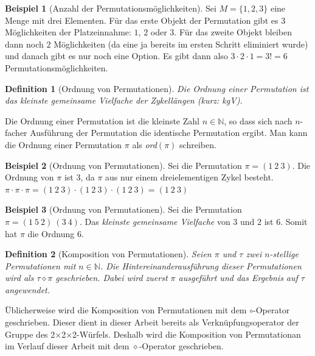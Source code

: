 \documentclass[12pt,a4paper, usenames, dvipsnames]{article}
\theoremstyle{mystyle}
\newtheorem{definition}{Definition}
\theoremstyle{definition}
\newtheorem{bsp}{Beispiel}[definition]
\newcommand{\Ttwo}{2$\times$2$\times$2-}
\begin{document}
\begin{bsp}[Anzahl der Permutationsmöglichkeiten]
Sei $M = \{ 1, 2,3  \}$ eine Menge mit drei Elementen. Für das erste Objekt der Permutation gibt es $3$ Möglichkeiten der Platzeinnahme: $1$, $2$ oder $3$. Für das zweite Objekt bleiben dann noch $2$ Möglichkeiten (da eine ja bereits im ersten Schritt eliminiert wurde) und danach gibt es nur noch eine Option. Es gibt dann also $3 \cdot 2 \cdot 1 = 3! = 6$ Permutationsmöglichkeiten.

\end{bsp}

\begin{definition}[Ordnung von Permutationen]

Die Ordnung einer Permutation ist das kleinste gemeinsame Vielfache der Zykellängen (kurz: kgV).

\end{definition}

Die Ordnung einer Permutation ist die kleinste Zahl $n \in \mathbb{N}$, so dass sich nach $n$-facher Ausführung der Permutation die identische Permutation ergibt. Man kann die Ordnung einer Permutation $\pi$ als \textit{ord}$(\pi)$ schreiben.

\begin{bsp}[Ordnung von Permutationen]

Sei die Permutation $\pi = (1 \ 2 \ 3)$. Die Ordnung von $\pi$ ist 3, da $\pi$ aus nur einem dreielementigen Zykel besteht. $\pi \cdot \pi \cdot \pi = (1 \ 2 \ 3) \cdot (1 \ 2 \ 3) \cdot (1 \ 2 \ 3) =  (1 \ 2 \ 3) $

\end{bsp}

\begin{bsp}[Ordnung von Permutationen]

Sei die Permutation $\pi = (1 \ 5 \ 2)\ (3 \ 4)$. Das \textit{kleinste gemeinsame Vielfache} von $3$ und $2$ ist 6. Somit hat $\pi$ die Ordnung 6.

\end{bsp}

\begin{definition}[Komposition von Permutationen]
Seien $\pi$ und $\tau$ zwei $n$-stellige Permutationen mit $n \in \mathbb{N}$. Die Hintereinanderausführung dieser Permutationen wird als $\tau \diamond \pi$ geschrieben. Dabei wird zuerst $\pi$ ausgeführt und das Ergebnis auf $\tau$ angewendet.
\end{definition}
Üblicherweise wird die Komposition von Permutationen mit dem $\circ$-Operator geschrieben. Dieser dient in dieser Arbeit bereits als Verknüpfungsoperator der Gruppe des \Ttwo Würfels. Deshalb wird die Komposition von Permutationan im Verlauf dieser Arbeit mit dem $\diamond$-Operator geschrieben.
\end{document}
